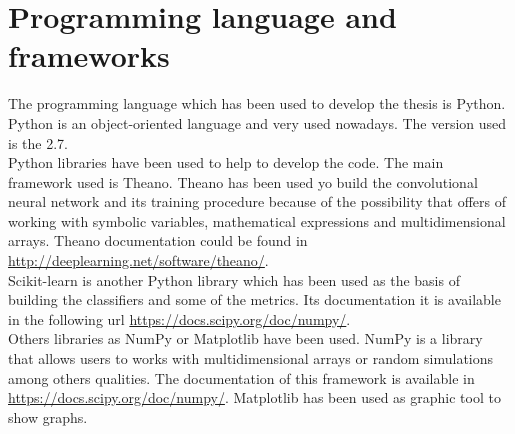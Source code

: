 \section{Programming language and frameworks}
The  programming language which has been used to develop the thesis is Python. Python is an object-oriented language and very used nowadays. The version used is the 2.7.\\

Python libraries have been used to help to develop the code. The main framework used is Theano. Theano has been used yo build the convolutional neural network and its training procedure because of the possibility that offers of working with symbolic variables, mathematical expressions and multidimensional arrays. Theano documentation could be found in \url{http://deeplearning.net/software/theano/}.\\

Scikit-learn is another Python library which has been used as the basis of building the classifiers and some of the metrics. Its documentation it is available in the following url \url{https://docs.scipy.org/doc/numpy/}.\\

Others libraries as NumPy or Matplotlib have been used. NumPy is a library that allows users to works with multidimensional arrays or random simulations among others qualities. The documentation of this framework is available in \url{https://docs.scipy.org/doc/numpy/}. Matplotlib has been used as graphic tool to show graphs.\\
